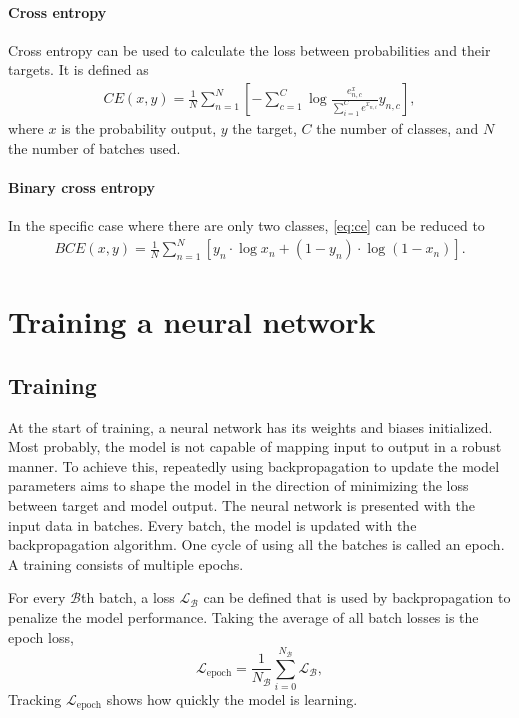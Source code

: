 \paragraph{Cross entropy}
Cross entropy can be used to calculate the loss between probabilities and their targets.
It is defined as
\begin{align}\label{eq:ce}
    CE(x, y) = \frac{1}{N}\sum_{n=1}^N \left[-\sum_{c=1}^C \log \frac{e^x_{n,c}}{\sum_{i=1}^C e^{x_{n,i}}} y_{n,c}\right],
\end{align}
where $x$ is the probability output, $y$ the target, $C$ the number of classes, and $N$ the number of batches used.

\paragraph{Binary cross entropy}
In the specific case where there are only two classes, \cref{eq:ce} can be reduced to
\begin{align}
    BCE(x, y) = \frac{1}{N}\sum_{n=1}^N [y_n \cdot \log x_n + (1 - y_n) \cdot \log (1-x_n)].
\end{align}


\section{Training a neural network}

\subsection{Training}\label{Training}
At the start of training, a neural network has its weights and biases initialized.
Most probably, the model is not capable of mapping input to output in a robust manner.
To achieve this, repeatedly using backpropagation to update the model parameters aims to shape the model in the direction of minimizing the loss between target and model output.
The neural network is presented with the input data in batches.
Every batch, the model is updated with the backpropagation algorithm.
One cycle of using all the batches is called an epoch.
A training consists of multiple epochs.

For every $\mathcal{B}$th batch, a loss $\mathcal{L}_\mathcal{B}$ can be defined that is used by backpropagation to penalize the model performance.
Taking the average of all batch losses is the epoch loss,
\begin{equation}
    \mathcal{L}_\mathrm{epoch} = \frac{1}{N_\mathcal{B}}\sum_{i=0}^{N_\mathcal{B}}\mathcal{L}_\mathcal{B},
\end{equation}
Tracking $\mathcal{L}_\mathrm{epoch}$ shows how quickly the model is learning.

